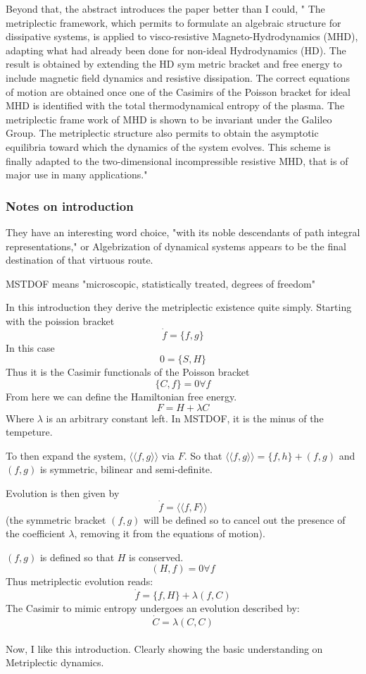 Beyond that, the abstract introduces the paper better than I could,
" The metriplectic framework, which permits to formulate an algebraic structure for dissipative
 systems, is applied to visco-resistive Magneto-Hydrodynamics (MHD), adapting what had already
 been done for non-ideal Hydrodynamics (HD). The result is obtained by extending the HD sym
metric bracket and free energy to include magnetic field dynamics and resistive dissipation. The correct equations of motion are obtained once one of the Casimirs of the Poisson bracket for ideal MHD is identified with the total thermodynamical entropy of the plasma. The metriplectic frame work of MHD is shown to be invariant under the Galileo Group. The metriplectic structure also permits to obtain the asymptotic equilibria toward which the dynamics of the system evolves. This scheme is finally adapted to the two-dimensional incompressible resistive MHD, that is of major use in many applications."
\subsubsection{Notes on introduction}
They have an interesting word choice, "with its noble descendants of path integral representations," or Algebrization of dynamical systems appears to be the final destination of that virtuous route.

MSTDOF means "microscopic, statistically treated, degrees of freedom"

In this introduction they derive the metriplectic existence quite simply.
Starting with the poission bracket 
$$\dot{f}=\{f,g\}$$
In this case
$$0= \{S,H\}$$
Thus it is the Casimir functionals of the Poisson bracket
$$\{C,f\}=0 \forall f$$
From here we can define the Hamiltonian free energy. 
$$F=H+\lambda C $$
Where $\lambda$ is an arbitrary constant left. In MSTDOF, it is the minus of the tempeture.

To then expand the system, $\langle\langle f,g \rangle \rangle$ via $F$. So that $\langle\langle f, g\rangle \rangle=\{f,h\} + (f,g)$ and $(f,g)$ is symmetric, bilinear and semi-definite.

Evolution is then given by
$$\dot{f}=\langle\langle f, F\rangle \rangle$$
(the symmetric bracket $(f,g)$ will be defined so to cancel out the presence of the coefficient
 $\lambda$, removing it from the equations of motion).

 $(f,g)$ is defined so that $H$ is conserved.
 $$(H, f) = 0 \forall f$$
 Thus metriplectic evolution reads:
 $$\dot{f}=\{f,H\}+\lambda(f,C)$$
 The Casimir to mimic entropy undergoes an evolution described by:
 $$\dot{C}=\lambda(C,C)$$
 \\
 Now, I like this introduction. Clearly showing the basic understanding on Metriplectic dynamics.

